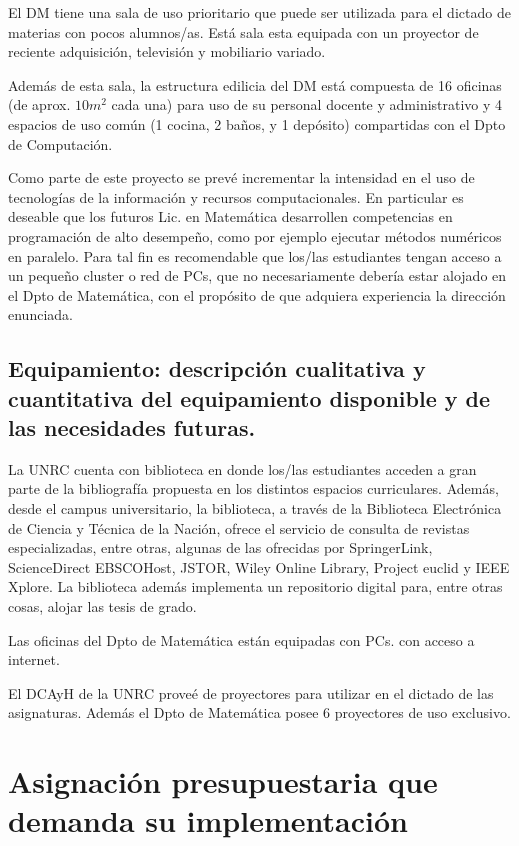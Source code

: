 \documentclass[a4paper, 12pt]{article}
\begin{document}
 El DM tiene  una sala de uso prioritario que puede ser utilizada para el dictado de materias con pocos alumnos/as. Está sala esta equipada con un proyector de reciente adquisición, televisión y mobiliario variado. 

Además de esta sala, la estructura edilicia del  DM está compuesta de   16 oficinas (de aprox. $10m^2$ cada una) para uso de su personal docente y administrativo y 4 espacios de uso común (1 cocina, 2 baños, y 1 depósito) compartidas con el Dpto de Computación. 


Como parte de este proyecto se prevé incrementar la intensidad en el uso de tecnologías de la información  y recursos computacionales. En particular es deseable que los futuros Lic. en Matemática desarrollen competencias en programación de alto desempeño, como por ejemplo ejecutar métodos numéricos en paralelo. Para tal fin es recomendable que los/las estudiantes tengan acceso a un pequeño cluster o red de PCs, que no necesariamente debería estar alojado en el Dpto de Matemática, con el propósito de que adquiera experiencia la dirección enunciada. 


\subsection{Equipamiento: descripción cualitativa y cuantitativa del equipamiento disponible y de las necesidades futuras.}


La UNRC cuenta con  biblioteca en donde los/las estudiantes acceden a gran parte de la bibliografía propuesta en los distintos espacios curriculares. Además, desde el campus universitario, la biblioteca, a través de la Biblioteca Electrónica de Ciencia y Técnica de 
la Nación,  ofrece el servicio de consulta de revistas  especializadas, entre otras, algunas de las  ofrecidas por SpringerLink, ScienceDirect EBSCOHost, JSTOR, Wiley Online Library,  Project euclid y  IEEE Xplore. La biblioteca además implementa un repositorio digital para, entre otras cosas, alojar las tesis de grado. 

Las oficinas del Dpto de Matemática están equipadas con PCs. con acceso a internet.

El DCAyH de la UNRC proveé de proyectores para utilizar en el dictado de las asignaturas. Además el Dpto de Matemática posee 6 proyectores de uso exclusivo.  



\section{Asignación presupuestaria que demanda su
implementación}
\end{document}
